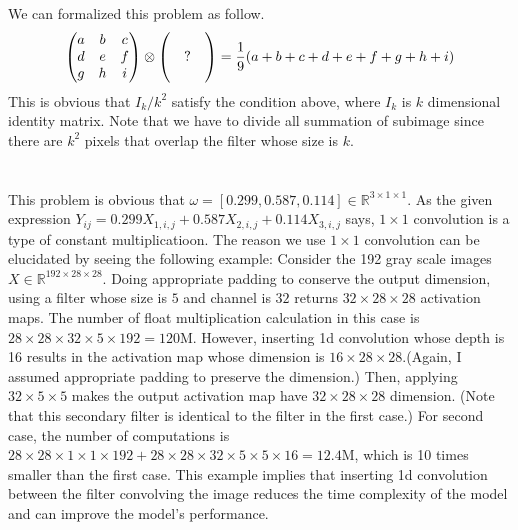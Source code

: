 \documentclass[10pt]{article}
\begin{document}
\section{}
We can formalized this problem as follow.
\begin{equation*}
    \begin{pmatrix}
        a & b & c \\ d & e & f \\ g & h & i
    \end{pmatrix}
    \otimes
    \begin{pmatrix}
        \empty & \empty & \empty \\ \empty & ? & \empty \\ \empty & \empty & \empty
    \end{pmatrix}
    = \frac{1}{9}(a + b + c + d + e + f + g + h + i)
\end{equation*}
This is obvious that $I_k/k^2$ satisfy the condition above, where $I_k$ is $k$ dimensional identity matrix.
Note that we have to divide all summation of subimage since there are $k^2$ pixels that overlap the filter whose size is $k$.

\section{}
This problem is obvious that $\omega = [0.299, 0.587, 0.114]\in\mathbb{R}^{3\times 1 \times 1}$. 
As the given expression $Y_{ij} = 0.299X_{1,i,j} + 0.587 X_{2,i,j} + 0.114 X_{3,i,j}$ says, $1\times 1$ convolution is a type of constant multiplicatioon.
The reason we use $1\times 1$ convolution can be elucidated by seeing the following example: Consider the 192 gray scale images $X \in \mathbb{R}^{192\times 28 \times 28}$. Doing appropriate padding to conserve the output dimension, using a filter whose size is $5$ and channel is $32$ returns $32 \times 28 \times 28$ activation maps. 
The number of float multiplication calculation in this case is $28\times 28\times 32 \times 5 \times 192 = 120$M. However, inserting 1d convolution whose depth is 16 results in the activation map whose dimension is $16 \times 28 \times 28$.(Again, I assumed appropriate padding to preserve the dimension.) Then, applying $32\times 5 \times 5$ makes the output activation map have $32 \times 28 \times 28$ dimension. (Note that this secondary filter is identical to the filter in the first case.)
For second case, the number of computations is $28\times 28 \times 1 \times 1\times 192 + 28\times 28\times 32 \times 5 \times 5 \times 16 = 12.4$M, which is 10 times smaller than the first case.  
This example implies that inserting 1d convolution between the filter convolving the image reduces the time complexity of the model and can improve the model's performance.
\end{document}
